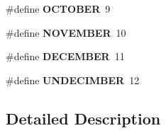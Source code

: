 \begin{DoxyCompactItemize}
\item 
\hypertarget{group___month_gafcc907d899cb251b276471377eb3167d}{\#define {\bfseries O\-C\-T\-O\-B\-E\-R}~9}\label{group___month_gafcc907d899cb251b276471377eb3167d}

\item 
\hypertarget{group___month_gaf3425337a41dcd531f90a45c83d1c097}{\#define {\bfseries N\-O\-V\-E\-M\-B\-E\-R}~10}\label{group___month_gaf3425337a41dcd531f90a45c83d1c097}

\item 
\hypertarget{group___month_gae44b1c7265639c4e3609b1a55941f63a}{\#define {\bfseries D\-E\-C\-E\-M\-B\-E\-R}~11}\label{group___month_gae44b1c7265639c4e3609b1a55941f63a}

\item 
\hypertarget{group___month_gaff029c1d85091d3718126de8aa49827d}{\#define {\bfseries U\-N\-D\-E\-C\-I\-M\-B\-E\-R}~12}\label{group___month_gaff029c1d85091d3718126de8aa49827d}

\end{DoxyCompactItemize}


\subsection{Detailed Description}
